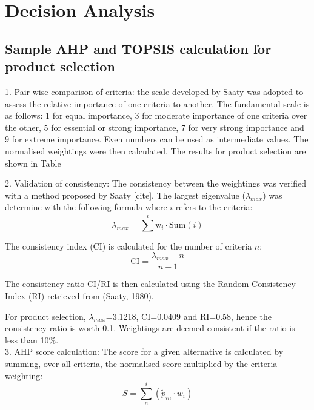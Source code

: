 \section{Decision Analysis}
\label{app:matrix}

\subsection{Sample AHP and TOPSIS calculation for product selection}

1. Pair-wise comparison of criteria: the scale developed by Saaty was adopted to assess the relative importance of one criteria to another. The fundamental scale is as follows: 1 for equal importance, 3 for moderate importance of one criteria over the other, 5 for essential or strong importance, 7 for very strong importance and 9 for extreme importance. Even numbers can be used as intermediate values. The normalised weightings were then calculated. The results for product selection are shown in Table


2. Validation of consistency: The consistency between the weightings was verified with a method proposed by Saaty [cite]. The largest eigenvalue ($\lambda_{max}$) was determine with the following formula where $i$ refers to the criteria:
\begin{equation}
    \lambda_{max}=\sum^{i} \mathrm{w}_{i}\cdot \mathrm{Sum}(i)
\end{equation}

The consistency index (CI) is calculated for the number of criteria $n$:
\begin{equation}
   \mathrm{CI} = \frac{\lambda_{max}-n}{n-1}
\end{equation}

The consistency ratio CI/RI is then calculated using the Random Consistency Index (RI) retrieved from (Saaty, 1980). 

For product selection, $\lambda_{max}$=3.1218, CI=0.0409 and RI=0.58, hence the consistency ratio is worth 0.1. Weightings are deemed consistent if the ratio is less than 10\%.\\

3. AHP score calculation: The score for a given alternative is calculated by summing, over all criteria, the normalised score multiplied by the criteria weighting:
\begin{equation}
    S=\sum^{i}_{n}(\tilde{p}_{in} \cdot w_{i})
\end{equation}

